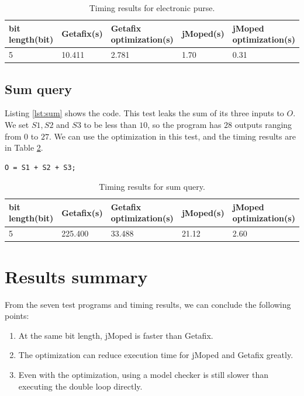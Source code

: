 \begin{table}[!h]
\centering
\begin{tabular}{|l|l|l|l|l|}
\hline
{bit length(bit)} & Getafix(s) & {Getafix optimization(s)} & jMoped(s) & {jMoped optimization(s)} \\ \hline
{5} & {10.411} & {2.781} & {1.70} & {0.31} \\ \hline
\end{tabular}
\caption{Timing results for electronic purse.}
\label{tbl:electronic}
\end{table}

\subsection{Sum query}
Listing \ref{lst:sum} shows the code. This test leaks the sum of its three inputs to $O$. We set $S1, S2$ and $S3$ to be less than $10$, so the program has $28$ outputs ranging from $0$ to $27$. We can use the optimization in this test, and the timing results are in Table \ref{tbl:sum}.

\lstset{language=C}  
\begin{lstlisting}[float=!h, caption={Sum query test program.},label=lst:sum]
O = S1 + S2 + S3;
\end{lstlisting}

\begin{table}[!h]
\centering
\begin{tabular}{|l|l|l|l|l|}
\hline
{bit length(bit)} & Getafix(s) & {Getafix optimization(s)} & jMoped(s) & {jMoped optimization(s)} \\ \hline
5 & 225.400 & 33.488 & 21.12 & 2.60	\\ \hline
\end{tabular}
\caption{Timing results for sum query.}
\label{tbl:sum}
\end{table}

\section{Results summary}
From the seven test programs and timing results, we can conclude the following points:
\begin{enumerate}
\item At the same bit length, jMoped is faster than Getafix. 
\item The optimization can reduce execution time for jMoped and Getafix greatly.
\item Even with the optimization, using a model checker is still slower than executing the double loop directly.
\end{enumerate}

